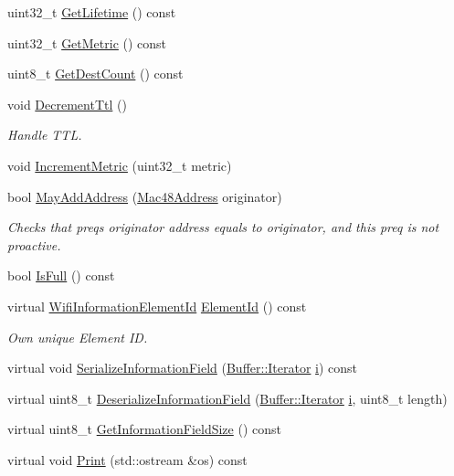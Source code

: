 \begin{DoxyCompactItemize}
uint32\+\_\+t \hyperlink{classns3_1_1dot11s_1_1IePreq_a62b94a0dbd1b6d0b58605b6b5c41b955}{Get\+Lifetime} () const 
\item 
uint32\+\_\+t \hyperlink{classns3_1_1dot11s_1_1IePreq_acee86c5b755d7605a6b08214e45d30a3}{Get\+Metric} () const 
\item 
uint8\+\_\+t \hyperlink{classns3_1_1dot11s_1_1IePreq_a39ccf39b284f4d67f29a00dab1a5be8b}{Get\+Dest\+Count} () const 
\item 
void \hyperlink{classns3_1_1dot11s_1_1IePreq_a8b92ecb400fa77d9e85ab348f23fa8e0}{Decrement\+Ttl} ()
\begin{DoxyCompactList}\small\item\em Handle T\+TL. \end{DoxyCompactList}\item 
void \hyperlink{classns3_1_1dot11s_1_1IePreq_ac78997fec3c2ff926e847116b04b5089}{Increment\+Metric} (uint32\+\_\+t metric)
\item 
bool \hyperlink{classns3_1_1dot11s_1_1IePreq_ab1dd432aafda0b9975921b7531d3c35a}{May\+Add\+Address} (\hyperlink{classns3_1_1Mac48Address}{Mac48\+Address} originator)
\begin{DoxyCompactList}\small\item\em Checks that preq\textquotesingle{}s originator address equals to originator, and this preq is not proactive. \end{DoxyCompactList}\item 
bool \hyperlink{classns3_1_1dot11s_1_1IePreq_adc22373fccf78716c5da41965cd1b8d8}{Is\+Full} () const 
\item 
virtual \hyperlink{namespacens3_aeb185e0c8a60816016bca079f1420478}{Wifi\+Information\+Element\+Id} \hyperlink{classns3_1_1dot11s_1_1IePreq_a8b0ca530009c35aa529a12f9170fb7de}{Element\+Id} () const 
\begin{DoxyCompactList}\small\item\em Own unique Element ID. \end{DoxyCompactList}\item 
virtual void \hyperlink{classns3_1_1dot11s_1_1IePreq_a63f72243f43a80199b2016ffc736f932}{Serialize\+Information\+Field} (\hyperlink{classns3_1_1Buffer_1_1Iterator}{Buffer\+::\+Iterator} \hyperlink{lte__uplink__power__control_8m_a6f6ccfcf58b31cb6412107d9d5281426}{i}) const 
\item 
virtual uint8\+\_\+t \hyperlink{classns3_1_1dot11s_1_1IePreq_a74e347ed4ea479edd313986c89ba33d2}{Deserialize\+Information\+Field} (\hyperlink{classns3_1_1Buffer_1_1Iterator}{Buffer\+::\+Iterator} \hyperlink{lte__uplink__power__control_8m_a6f6ccfcf58b31cb6412107d9d5281426}{i}, uint8\+\_\+t length)
\item 
virtual uint8\+\_\+t \hyperlink{classns3_1_1dot11s_1_1IePreq_a173f85ed80f15ec3235dc9649a5a55d7}{Get\+Information\+Field\+Size} () const 
\item 
virtual void \hyperlink{classns3_1_1dot11s_1_1IePreq_a2a9be9495b22ab123d94db1969d452cb}{Print} (std\+::ostream \&os) const 
\end{DoxyCompactItemize}
